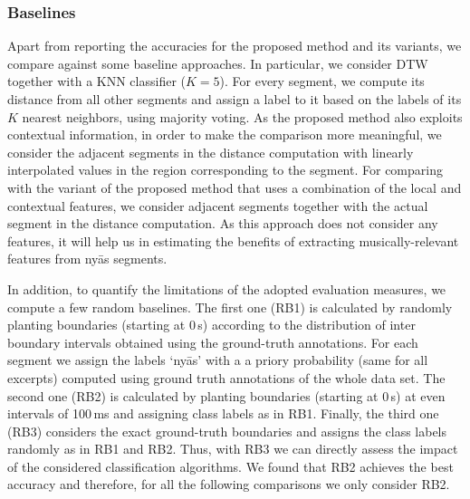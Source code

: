 {{\subsubsection{Baselines}

Apart from reporting the accuracies for the proposed method and its variants, we compare against some baseline approaches. In particular, we consider DTW together with a KNN classifier ($K=5$). For every segment, we compute its distance from all other segments and assign a label to it based on the labels of its $K$ nearest neighbors, using majority voting. As the proposed method also exploits contextual information, in order to make the comparison more meaningful, we consider the adjacent segments in the distance computation with linearly interpolated values in the region corresponding to the segment. For comparing with the variant of the proposed method that uses a combination of the local and contextual features, we consider adjacent segments together with the actual segment in the distance computation. As this approach does not consider any features, it will help us in estimating the benefits of extracting musically-relevant features from ny\={a}s segments. 

In addition, to quantify the limitations of the adopted evaluation measures, we compute a few random baselines. The first one (RB1) is calculated by randomly planting boundaries (starting at 0\,s) according to the distribution of inter boundary intervals obtained using the ground-truth annotations. For each segment we assign the labels `ny\={a}s' with a a priory probability (same for all excerpts) computed using ground truth annotations of the whole data set. The second one (RB2) is calculated by planting boundaries (starting at 0\,s) at even intervals of 100\,ms and assigning class labels as in RB1. Finally, the third one (RB3) considers the exact ground-truth boundaries and assigns the class labels randomly as in RB1 and RB2. Thus, with RB3 we can directly assess the impact of the considered classification algorithms. We found that RB2 achieves the best accuracy and therefore, for all the following comparisons we only consider RB2.

%

}}
